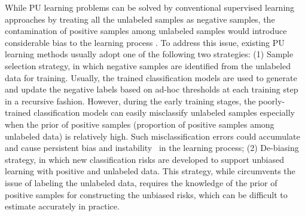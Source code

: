 \documentclass[sigconf]{acmart}
\begin{document}
While PU learning problems can be solved by  conventional supervised learning approaches by treating all the unlabeled samples as negative samples, the contamination of positive samples among unlabeled samples would introduce considerable bias to the learning process \cite{bekker2020learning}. To address this issue, existing PU learning methods usually adopt one of the following two strategies: (1) Sample selection strategy, in which negative samples are identified from the unlabeled data for training. Usually, the trained classification models are used to generate and update the negative labels based on ad-hoc thresholds at each training step in a recursive fashion. However, during the early training stages, the poorly-trained classification models can easily misclassify unlabeled samples especially when the prior of positive samples (proportion of positive samples among unlabeled data) is relatively high. Such misclassification errors could accumulate and cause persistent bias and instability~\cite{Xu2019RevisitingSS} in the learning process; (2) De-biasing strategy, in which new classification risks are developed to support unbiased learning with positive and unlabeled data. This strategy, while circumvents the issue of labeling the unlabeled data, requires the knowledge of the prior of positive samples for constructing the unbiased risks, which can be difficult to estimate accurately in practice. 

\end{document}
